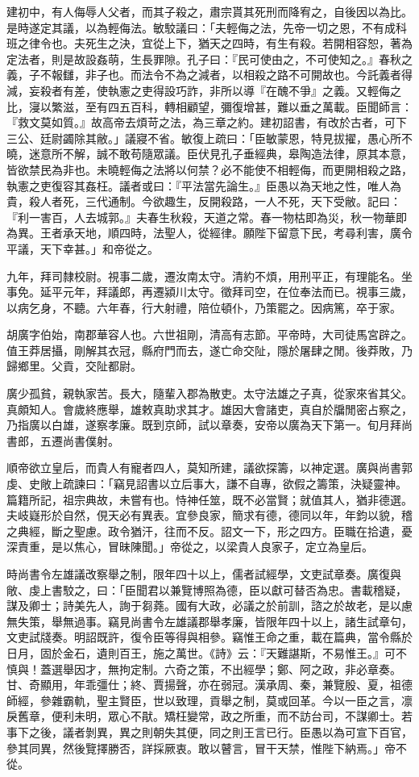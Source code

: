 \begin{pinyinscope}
建初中，有人侮辱人父者，而其子殺之，肅宗貰其死刑而降宥之，自後因以為比。是時遂定其議，以為輕侮法。敏駮議曰：「夫輕侮之法，先帝一切之恩，不有成科班之律令也。夫死生之決，宜從上下，猶天之四時，有生有殺。若開相容恕，著為定法者，則是故設姦萌，生長罪隙。孔子曰：『民可使由之，不可使知之。』春秋之義，子不報讎，非子也。而法令不為之減者，以相殺之路不可開故也。今託義者得減，妄殺者有差，使執憲之吏得設巧詐，非所以導『在醜不爭』之義。又輕侮之比，寖以繁滋，至有四五百科，轉相顧望，彌復增甚，難以垂之萬載。臣聞師言：『救文莫如質。』故高帝去煩苛之法，為三章之約。建初詔書，有改於古者，可下三公、廷尉蠲除其敝。」議寢不省。敏復上疏曰：「臣敏蒙恩，特見拔擢，愚心所不曉，迷意所不解，誠不敢苟隨眾議。臣伏見孔子垂經典，皋陶造法律，原其本意，皆欲禁民為非也。未曉輕侮之法將以何禁？必不能使不相輕侮，而更開相殺之路，執憲之吏復容其姦枉。議者或曰：『平法當先論生。』臣愚以為天地之性，唯人為貴，殺人者死，三代通制。今欲趣生，反開殺路，一人不死，天下受敝。記曰：『利一害百，人去城郭。』夫春生秋殺，天道之常。春一物枯即為災，秋一物華即為異。王者承天地，順四時，法聖人，從經律。願陛下留意下民，考尋利害，廣令平議，天下幸甚。」和帝從之。

九年，拜司隸校尉。視事二歲，遷汝南太守。清約不煩，用刑平正，有理能名。坐事免。延平元年，拜議郎，再遷潁川太守。徵拜司空，在位奉法而已。視事三歲，以病乞身，不聽。六年春，行大射禮，陪位頓仆，乃策罷之。因病篤，卒于家。

胡廣字伯始，南郡華容人也。六世祖剛，清高有志節。平帝時，大司徒馬宮辟之。值王莽居攝，剛解其衣冠，縣府門而去，遂亡命交阯，隱於屠肆之閒。後莽敗，乃歸鄉里。父貢，交阯都尉。

廣少孤貧，親執家苦。長大，隨輩入郡為散吏。太守法雄之子真，從家來省其父。真頗知人。會歲終應舉，雄敕真助求其才。雄因大會諸吏，真自於牖閒密占察之，乃指廣以白雄，遂察孝廉。既到京師，試以章奏，安帝以廣為天下第一。旬月拜尚書郎，五遷尚書僕射。

順帝欲立皇后，而貴人有寵者四人，莫知所建，議欲探籌，以神定選。廣與尚書郭虔、史敞上疏諫曰：「竊見詔書以立后事大，謙不自專，欲假之籌策，決疑靈神。篇籍所記，祖宗典故，未嘗有也。恃神任筮，既不必當賢；就值其人，猶非德選。夫岐嶷形於自然，俔天必有異表。宜參良家，簡求有德，德同以年，年鈞以貌，稽之典經，斷之聖慮。政令猶汗，往而不反。詔文一下，形之四方。臣職在拾遺，憂深責重，是以焦心，冒昧陳聞。」帝從之，以梁貴人良家子，定立為皇后。

時尚書令左雄議改察舉之制，限年四十以上，儒者試經學，文吏試章奏。廣復與敞、虔上書駮之，曰：「臣聞君以兼覽博照為德，臣以獻可替否為忠。書載稽疑，謀及卿士；詩美先人，詢于芻蕘。國有大政，必議之於前訓，諮之於故老，是以慮無失策，舉無過事。竊見尚書令左雄議郡舉孝廉，皆限年四十以上，諸生試章句，文吏試牋奏。明詔既許，復令臣等得與相參。竊惟王命之重，載在篇典，當令縣於日月，固於金石，遺則百王，施之萬世。《詩》云：『天難諶斯，不易惟王。』可不慎與！蓋選舉因才，無拘定制。六奇之策，不出經學；鄭、阿之政，非必章奏。甘、奇顯用，年乖彊仕；終、賈揚聲，亦在弱冠。漢承周、秦，兼覽殷、夏，祖德師經，參雜霸軌，聖主賢臣，世以致理，貢舉之制，莫或回革。今以一臣之言，凛戾舊章，便利未明，眾心不猒。矯枉變常，政之所重，而不訪台司，不謀卿士。若事下之後，議者剝異，異之則朝失其便，同之則王言已行。臣愚以為可宣下百官，參其同異，然後覽擇勝否，詳採厥衷。敢以瞽言，冒干天禁，惟陛下納焉。」帝不從。


\end{pinyinscope}

